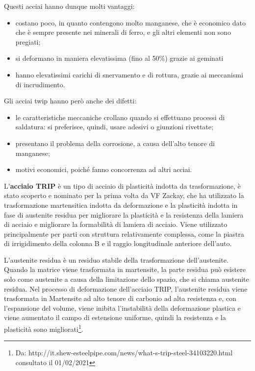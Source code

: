 Questi acciai hanno dunque molti vantaggi:
\begin{itemize}
    \item costano poco, in quanto contengono molto manganese, che è economico dato che è sempre presente nei minerali di ferro, e gli altri elementi non sono pregiati;
    \item si deformano in maniera elevatissima (fino al 50\%) grazie ai geminati
    \item hanno elevatissimi carichi di snervamento e di rottura, grazie ai meccanismi di incrudimento.
\end{itemize}

Gli acciai twip hanno però anche dei difetti:
\begin{itemize}
    \item le caratteristiche meccaniche crollano quando si effettuano processi di saldatura: si preferisce, quindi, usare adesivi o giunzioni rivettate;
    \item presentano il problema della corrosione, a causa dell’alto tenore di manganese;
    \item motivi economici, poiché fanno concorrenza ad altri acciai.
\end{itemize}

L'\textbf{acciaio TRIP} è un tipo di acciaio di plasticità indotta da trasformazione, è stato scoperto e nominato per la prima volta da VF Zackay, che ha utilizzato la trasformazione martensitica indotta da deformazione e la plasticità indotta in fase di austenite residua per migliorare la plasticità e la resistenza della lamiera di acciaio e migliorare la formabilità di lamiera di acciaio. Viene utilizzato principalmente per parti con struttura relativamente complessa, come la piastra di irrigidimento della colonna B e il raggio longitudinale anteriore dell'auto.

L'austenite residua è un residuo stabile della trasformazione dell'austenite. Quando la matrice viene trasformata in martensite, la parte residua può esistere solo come austenite a causa della limitazione dello spazio, che si chiama austenite residua. Nel processo di deformazione dell'acciaio TRIP, l'austenite residua viene trasformata in Martensite ad alto tenore di carbonio ad alta resistenza e, con l'espansione del volume, viene inibita l'instabilità della deformazione plastica e viene aumentato il campo di estensione uniforme, quindi la resistenza e la plasticità sono migliorati\footnote{Da: http://it.shew-esteelpipe.com/news/what-s-trip-steel-34103220.html consultato il 01/02/2021}.

